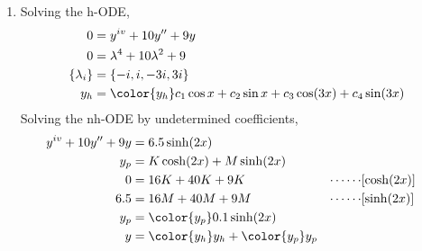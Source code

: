 \begin{enumerate}
    \item Solving the h-ODE,
          \begin{align}
              0               & = y^{iv} + 10y'' + 9y                                \\
              0               & = \lambda^{4} + 10\lambda^{2} + 9                    \\
              \{\lambda_{i}\} & = \{-i, i, -3i, 3i\}                                 \\
              y_{h}           & = \color{y_h} c_1 \cos x + c_2 \sin x + c_3 \cos(3x)
              + c_4 \sin(3x)
          \end{align}
          Solving the nh-ODE by undetermined coefficients,
          \begin{align}
              y^{iv} + 10y'' + 9y & = 6.5\sinh(2x)                                                           \\
              y_{p}               & = K\cosh(2x) + M\sinh(2x)                                                \\
              0                   & = 16K + 40K + 9K                            & \cdots\cdots & [\cosh(2x)] \\
              6.5                 & = 16M + 40M + 9M                            & \cdots\cdots & [\sinh(2x)] \\
              y_{p}               & = \color{y_p} 0.1\sinh(2x)                                               \\
              y                   & = {\color{y_h} y_{h}} + {\color{y_p} y_{p}}
          \end{align}


\end{enumerate}
